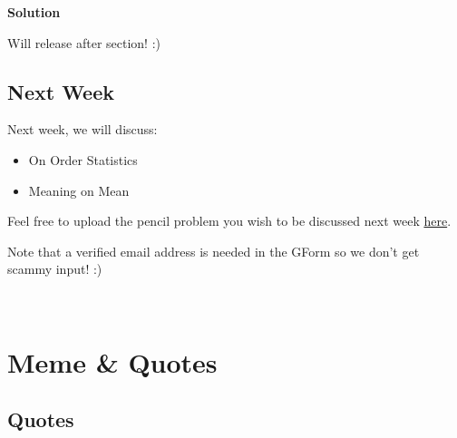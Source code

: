 \documentclass[
  letterpaper,
  DIV=11,
  numbers=noendperiod]{scrreprt}
\providecommand{\tightlist}{%
  \setlength{\itemsep}{0pt}\setlength{\parskip}{0pt}}\usepackage{longtable,booktabs,array}
\theoremstyle{definition}
\theoremstyle{plain}
\theoremstyle{remark}
\begin{document}
\begin{tcolorbox}[enhanced jigsaw, leftrule=.75mm, colframe=quarto-callout-tip-color-frame, colback=white, breakable, opacityback=0, left=2mm, bottomrule=.15mm, arc=.35mm, rightrule=.15mm, toprule=.15mm]
\begin{minipage}[t]{5.5mm}
\textcolor{quarto-callout-tip-color}{\faLightbulb}
\end{minipage}%
\begin{minipage}[t]{\textwidth - 5.5mm}

\textbf{Solution}\vspace{2mm}

Will release after section! :)

\end{minipage}%
\end{tcolorbox}

\hypertarget{next-week-1}{%
\section*{Next Week}\label{next-week-1}}


Next week, we will discuss:

\begin{itemize}
\tightlist
\item
  On Order Statistics
\item
  Meaning on Mean
\end{itemize}

Feel free to upload the pencil problem you wish to be discussed next
week \href{https://forms.gle/RBmMNYJp4u3qD5W79}{here}.

Note that a verified email address is needed in the GForm so we don't
get scammy input! :)

\(\,\)


\hypertarget{meme-quotes}{%
\chapter*{Meme \& Quotes}\label{meme-quotes}}


\hypertarget{quotes}{%
\section*{Quotes}\label{quotes}}
\end{document}
